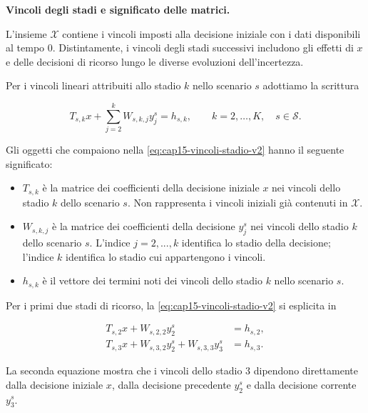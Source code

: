 \medskip

\noindent
\textbf{Vincoli degli stadi e significato delle matrici.}

L'insieme $\mathcal X$ contiene
i vincoli imposti alla decisione
iniziale con i dati disponibili
al tempo $0$. Distintamente,
i vincoli degli stadi successivi
includono gli effetti di $x$
e delle decisioni di ricorso
lungo le diverse evoluzioni
dell'incertezza.

Per i vincoli lineari attribuiti
allo stadio $k$ nello scenario
$s$ adottiamo la scrittura

\begin{equation}
T_{s,k}x+
\sum_{j=2}^{k}W_{s,k,j}y_j^s
=
h_{s,k},
\qquad
k=2,\ldots,K,\quad s\in\mathcal S.
\label{eq:cap15-vincoli-stadio-v2}
\end{equation}

Gli oggetti che compaiono nella
\eqref{eq:cap15-vincoli-stadio-v2}
hanno il seguente significato:

\begin{itemize}

\item $T_{s,k}$ \`e la matrice
dei coefficienti della decisione
iniziale $x$ nei vincoli dello
stadio $k$ dello scenario $s$.
Non rappresenta i vincoli iniziali
gi\`a contenuti in $\mathcal X$.

\item $W_{s,k,j}$ \`e la matrice
dei coefficienti della decisione
$y_j^s$ nei vincoli dello stadio
$k$ dello scenario $s$.
L'indice $j=2,...,k$ identifica lo stadio
della decisione; l'indice $k$
identifica lo stadio cui
appartengono i vincoli.

\item $h_{s,k}$ \`e il vettore
dei termini noti dei vincoli
dello stadio $k$ nello scenario $s$.

\end{itemize}

Per i primi due stadi di ricorso,
la \eqref{eq:cap15-vincoli-stadio-v2}
si esplicita in

\[
\begin{aligned}
T_{s,2}x+
W_{s,2,2}y_2^s
&=h_{s,2},
\\[4pt]
T_{s,3}x+
W_{s,3,2}y_2^s+
W_{s,3,3}y_3^s
&=h_{s,3}.
\end{aligned}
\]

La seconda equazione mostra che
i vincoli dello stadio $3$
dipendono direttamente
dalla decisione iniziale $x$,
dalla decisione precedente
$y_2^s$ e dalla decisione
corrente $y_3^s$.

